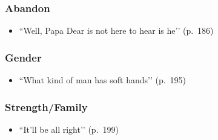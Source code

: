 \documentclass[a4paper]{article}
\begin{document}
\subsubsection{Abandon}
\begin{itemize}
    \item ``Well, Papa Dear is not here to hear is he’’ (p.~186)
\end{itemize}

\subsubsection{Gender}
\begin{itemize}
    \item ``What kind of man has soft hands’’ (p.~195)
\end{itemize}

\subsubsection{Strength/Family}
\begin{itemize}
    \item ``It’ll be all right’’ (p.~199)
\end{itemize}
\end{document}
